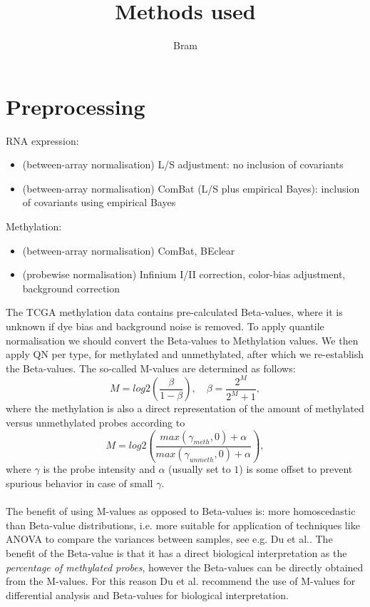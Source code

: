 \documentclass[a4paper,10pt]{article}
\title{Methods used}
\author{Bram}
\begin{document}
\section{Preprocessing}
%




RNA expression:
\begin{itemize}
 \item (between-array normalisation) L/S adjustment: no inclusion of covariants
 \item (between-array normalisation) ComBat (L/S plus empirical Bayes): inclusion of covariants using empirical Bayes
\end{itemize}
%
Methylation:
\begin{itemize}
 \item (between-array normalisation) ComBat, BEclear
 \item (probewise normalisation) Infinium I/II correction, color-bias adjustment, background correction
\end{itemize}
%

The TCGA methylation data contains pre-calculated Beta-values, where it is unknown if dye bias and background noise is removed.
To apply quantile normalisation we should convert the Beta-values to Methylation values. We then apply QN per type, for methylated and unmethylated, after which we re-establish the Beta-values.
%
The so-called M-values are determined as follows:
\begin{equation}
 M  = log2\left({\frac{\beta}{1-\beta}}\right), \quad \beta = \frac{2^M}{2^M+1},
\end{equation}
%
where the methylation is also a direct representation of the amount of methylated versus unmethylated probes according to
\begin{equation}
 M  = log2\left({\frac{max(\gamma_{meth},0)+\alpha}{max(\gamma_{unmeth},0)+\alpha}}\right),
\end{equation}
%
where $\gamma$ is the probe intensity and $\alpha$ (usually set to $1$) is some offset to prevent spurious behavior in case of small $\gamma$. \\ \\
%
The benefit of using M-values as opposed to Beta-values is: 
more homoscedastic than Beta-value distributions, i.e. more suitable for application of techniques like ANOVA to compare the variances between samples, see e.g. Du et al.\cite{Du2010}.
%
The benefit of the Beta-value is that it has a direct biological interpretation as the \textit{percentage of methylated probes}, however the Beta-values can be directly obtained from the M-values. For this reason Du et al.\cite{Du2010} recommend the use of M-values for differential analysis and Beta-values for biological interpretation.
%
\end{document}
